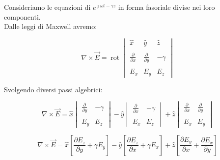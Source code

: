 Consideriamo le equazioni di $e^{\jmath \omega t - \gamma z}$ 
in forma fasoriale divise nei loro componenti. \\ 

Dalle leggi di Maxwell avremo: 

{
    \Large 
    \begin{equation}
            \nabla \times \vec{E} 
            = \operatorname{rot}
            \begin{vmatrix}
                \hat{x} & \hat{y} &\hat{z} \\ \\ 
                \frac{\partial}{\partial x} & \frac{\partial}{\partial y} & -\gamma \\ \\ 
                E_x & E_y & E_z
            \end{vmatrix}  
    \end{equation}
}

Svolgendo diversi passi algebrici: 

{
    \Large 
    \begin{equation}
        \nabla \times \vec{E} 
            = 
            \hat{x} 
            \begin{vmatrix}
            \frac{\partial}{\partial y} & -\gamma \\  \\ 
            E_y & E_z 
            \end{vmatrix}
            -\hat{y} 
            \begin{vmatrix}
            \frac{\partial}{\partial x} & -\gamma \\  \\ 
            E_x & E_z 
            \end{vmatrix}
            +\hat{z} 
            \begin{vmatrix}
            \frac{\partial}{\partial x} & \frac{\partial}{\partial y} \\  \\ 
            E_x & E_y 
            \end{vmatrix}
    \end{equation}
}

{
    \Large 
    \begin{equation}
            \nabla \times \vec{E}
            = 
            \hat{x} 
            [
                \frac{\partial E_z}{\partial y} 
                +\gamma E_y
            ]    
            -\hat{y} 
            [
                \frac{\partial E_z}{\partial x} 
                +\gamma E_x
            ]    
            +\hat{z} 
            [
                \frac{\partial E_y}{\partial x} 
                + \frac{\partial E_x}{\partial y}
            ] 
    \end{equation}
}

